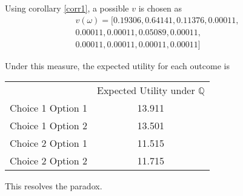 \documentclass{article}
\begin{document}
Using corollary \ref{corr1}, a possible \(v\) is chosen as 
\begin{equation*}
\begin{aligned}
v(\omega)=[0.19306, 0.64141, 0.11376, 0.00011, \\ 
0.00011, 0.00011, 0.05089, 0.00011, \\
0.00011, 0.00011, 0.00011, 0.00011]
\end{aligned}
\end{equation*}

Under this measure, the expected utility for each outcome is 

\begin{center} 
	\begin{tabular}{c c}
		& Expected Utility under \(\mathbb{Q}\) \\
		Choice 1 Option 1 & 13.911 \\
		Choice 1 Option 2 & 13.501 \\
		Choice 2 Option 1 & 11.515 \\
		Choice 2 Option 2 & 11.715 \\
	\end{tabular}
\end{center}

This resolves the paradox.  
	
\end{document}
